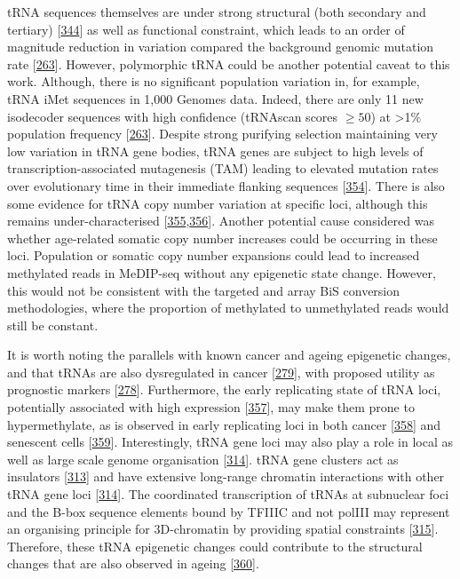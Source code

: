 \documentclass[
]{book}
\begin{document}
tRNA sequences themselves are under strong structural (both secondary and tertiary) {[}\protect\hyperlink{ref-Goodenbour2006}{344}{]} as well as functional constraint, which leads to an order of magnitude reduction in variation compared the background genomic mutation rate {[}\protect\hyperlink{ref-Parisien2013}{263}{]}.
However, polymorphic tRNA could be another potential caveat to this work.
Although, there is no significant population variation in, for example, tRNA iMet sequences in 1,000 Genomes data.
Indeed, there are only 11 new isodecoder sequences with high confidence (tRNAscan scores \(\ge50\)) at \textgreater1\% population frequency {[}\protect\hyperlink{ref-Parisien2013}{263}{]}.
Despite strong purifying selection maintaining very low variation in tRNA gene bodies, tRNA genes are subject to high levels of transcription-associated mutagenesis (TAM) leading to elevated mutation rates over evolutionary time in their immediate flanking sequences {[}\protect\hyperlink{ref-Thornlow2018}{354}{]}.
There is also some evidence for tRNA copy number variation at specific loci, although this remains under-characterised {[}\protect\hyperlink{ref-Iben2015}{355},\protect\hyperlink{ref-Darrow2014}{356}{]}.
Another potential cause considered was whether age-related somatic copy number increases could be occurring in these loci.
Population or somatic copy number expansions could lead to increased methylated reads in MeDIP-seq without any epigenetic state change.
However, this would not be consistent with the targeted and array BiS conversion methodologies, where the proportion of methylated to unmethylated reads would still be constant.

It is worth noting the parallels with known cancer and ageing epigenetic changes, and that tRNAs are also dysregulated in cancer {[}\protect\hyperlink{ref-Huang2018}{279}{]}, with proposed utility as prognostic markers {[}\protect\hyperlink{ref-Krishnan2016}{278}{]}.
Furthermore, the early replicating state of tRNA loci, potentially associated with high expression {[}\protect\hyperlink{ref-Muller2017}{357}{]}, may make them prone to hypermethylate, as is observed in early replicating loci in both cancer {[}\protect\hyperlink{ref-Du2019}{358}{]} and senescent cells {[}\protect\hyperlink{ref-Cruickshanks2013}{359}{]}.
Interestingly, tRNA gene loci may also play a role in local as well as large scale genome organisation {[}\protect\hyperlink{ref-VanBortle2017}{314}{]}.
tRNA gene clusters act as insulators {[}\protect\hyperlink{ref-Raab2011}{313}{]} and have extensive long-range chromatin interactions with other tRNA gene loci {[}\protect\hyperlink{ref-VanBortle2017}{314}{]}.
The coordinated transcription of tRNAs at subnuclear foci and the B-box sequence elements bound by TFIIIC and not polIII may represent an organising principle for 3D-chromatin by providing spatial constraints {[}\protect\hyperlink{ref-Noma2006}{315}{]}.
Therefore, these tRNA epigenetic changes could contribute to the structural changes that are also observed in ageing {[}\protect\hyperlink{ref-Sun2018}{360}{]}.
\end{document}
